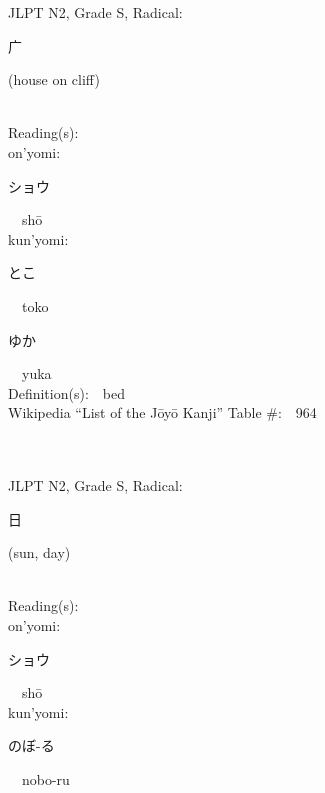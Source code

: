 \begin{multicols}{2}
{JLPT N2, Grade S, Radical:\ \ {\begin{CJK}{UTF8}{min} 广 \end{CJK}} (house on cliff) } \\
Reading(s):\ \ \\
{\hspace*{1em}}on'yomi:\ \ \\
{\hspace*{2em}}{\begin{CJK}{UTF8}{min} ショウ \end{CJK}}\ \ sh\=o\ \ \\
{\hspace*{1em}}kun'yomi:\ \ \\
{\hspace*{2em}}{\begin{CJK}{UTF8}{min} とこ \end{CJK}}\ \ toko\ \ \\
{\hspace*{2em}}{\begin{CJK}{UTF8}{min} ゆか \end{CJK}}\ \ yuka\ \ \\
Definition(s):\ \ bed \\
Wikipedia ``List of the J\=oy\=o Kanji'' Table \#:\ \ 964 \\
\ \ \\
{\fontsize{34pt}{40pt}  }\ \ \\  %
{JLPT N2, Grade S, Radical:\ \ {\begin{CJK}{UTF8}{min} 日 \end{CJK}} (sun, day) } \\
Reading(s):\ \ \\
{\hspace*{1em}}on'yomi:\ \ \\
{\hspace*{2em}}{\begin{CJK}{UTF8}{min} ショウ \end{CJK}}\ \ sh\=o\ \ \\
{\hspace*{1em}}kun'yomi:\ \ \\
{\hspace*{2em}}{\begin{CJK}{UTF8}{min} のぼ-る \end{CJK}}\ \ nobo-ru\ \ \\

\end{multicols}
